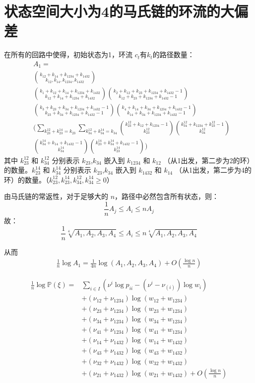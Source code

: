 \documentclass[cn,hazy,egreen,14pt,normal]{elegantnote}
\begin{document}
\section*{状态空间大小为4的马氏链的环流的大偏差}
在所有的回路中使得，初始状态为1，环流 $c_t$有$k_t$的路径数量：
\begin{align*}
    &A_1 = \\
    &\binom{k_{12}+k_{14}+k_{1234}+k_{1432}}{k_{12}, k_{14}, k_{1234}, k_{1432}} \\
    &\binom{k_{1}+k_{12}+k_{14}+k_{1234}+k_{1432}}{k_{12}+k_{14}+k_{1234}+k_{1432}}
    \binom{k_{2}+k_{12}+k_{23}+k_{1234}+k_{1432}-1}{k_{12}+k_{23}+k_{1234}+k_{1432}-1}\\
    &\binom{k_{3}+k_{23}+k_{34}+k_{1234}+k_{1432}-1}{k_{23}+k_{34}+k_{1234}+k_{1432}-1}
    \binom{k_{4}+k_{14}+k_{34}+k_{1234}+k_{1432}-1}{k_{14}+k_{34}+k_{1234}+k_{1432}-1}\\
    &\biggl(
        \sum_{k_{23}^{12}+k_{23}^{14}=k_{23}} \sum_{k_{34}^{12}+k_{34}^{14}=k_{34}}
        \binom{k_{23}^{12}+k_{12}+k_{1234}-1}{k_{23}^{12}}
        \binom{k_{34}^{12}+k_{1234}+k_{23}^{12}-1}{k_{34}^{12}} \\
        &\binom{k_{34}^{14}+k_{14}+k_{1432}-1}{k_{34}^{14}}
        \binom{k_{23}^{14}+k_{34}^{14}+k_{1432}-1}{k_{23}^{14}} 
    \biggr)
\end{align*}
其中 $k_{23}^{12}$ 和 $k_{34}^{12}$ 分别表示 $k_{23}$,$k_{34}$ 嵌入到 $k_{1234}$ 和 $k_{12}$ （从1出发，第二步为2的环）的数量。$k_{23}^{14}$ 和 $k_{34}^{14}$ 分别表示 $k_{23}$,$k_{34}$ 嵌入到 $k_{1432}$ 和 $k_{14}$ （从1出发，第二步为4的环）的数量。（$k_{23}^{12}, k_{23}^{14}, k_{34}^{12}, k_{34}^{14} \geq  0$）

由马氏链的常返性，对于足够大的 $n$，路径中必然包含所有状态，则：
$$
\frac{1}{n} A_j \leq A_i \leq n A_j
$$
故：
$$
\frac{1}{n} \sqrt[4]{A_1, A_2, A_3, A_4} \leq A_i \leq n \sqrt[4]{A_1, A_2, A_3, A_4}
$$

从而
\begin{align}
    \frac{1}{n} \log A_1 
    = \frac{1}{4n} \log (A_1, A_2, A_3, A_4) + O(\frac{\log n}{n})
\end{align}

\begin{align*}
    \frac{1}{n} \log \mathbb{P}(\xi)
    =& \sum_{i \in I} \left(\nu^{i} \log p_{ii} - (\nu^{i} - \nu_{(i)}) \log w_i \right) \\
    &+ (\nu_{12} + \nu_{1234}) \log(w_{12} + w_{1234}) \\
    &+ (\nu_{23} + \nu_{1234}) \log(w_{23} + w_{1234}) \\
    &+ (\nu_{34} + \nu_{1234}) \log(w_{34} + w_{1234}) \\
    &+ (\nu_{41} + \nu_{1234}) \log(w_{41} + w_{1234}) \\
    &+ (\nu_{14} + \nu_{1432}) \log(w_{14} + w_{1432}) \\
    &+ (\nu_{43} + \nu_{1432}) \log(w_{43} + w_{1432}) \\
    &+ (\nu_{32} + \nu_{1432}) \log(w_{32} + w_{1432}) \\
    &+ (\nu_{21} + \nu_{1432}) \log(w_{21} + w_{1432}) 
    + O(\frac{\log n}{n}) 
\end{align*}
\end{document}
